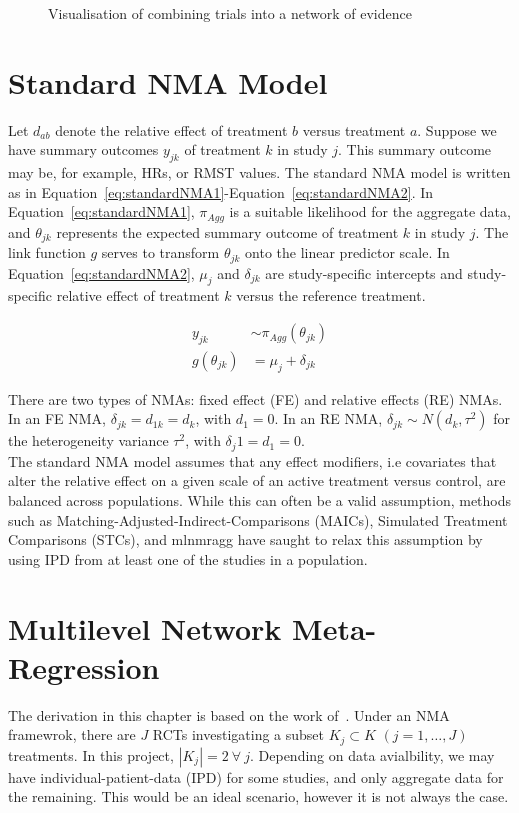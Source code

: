 \begin{figure}[h]
    \centering
    
    \caption{Visualisation of combining trials into a network of evidence}
    \label{fig:comb_evi}
\end{figure}

\section{Standard NMA Model}
Let $d_{ab}$ denote the relative effect of treatment $b$ versus treatment $a$. Suppose we have summary outcomes $y_{jk}$ of treatment $k$ in study $j$. This summary outcome may be, for example, HRs, or RMST values. The standard NMA model is written as in Equation~\ref{eq:standardNMA1}-Equation~\ref{eq:standardNMA2}. In Equation~\ref{eq:standardNMA1}, $\pi_{Agg}$ is a suitable likelihood for the aggregate data, and $\theta_{jk}$ represents the expected summary outcome of treatment $k$ in study $j$. The link function $g$ serves to transform $\theta_{jk}$ onto the linear predictor scale. In Equation~\ref{eq:standardNMA2}, $\mu_j$ and $\delta_{jk}$ are study-specific intercepts and study-specific relative effect of treatment $k$ versus the reference treatment.

\begin{align}
    y_{jk} &\sim \pi_{Agg}(\theta_{jk}) \label{eq:standardNMA1} \\
    g(\theta_{jk}) &= \mu_j + \delta_{jk} \label{eq:standardNMA2}
\end{align}

There are two types of NMAs: fixed effect (FE) and relative effects (RE) NMAs. In an FE NMA, $\delta_{jk} = d_{1k} = d_k$, with $d_1 = 0$. In an RE NMA, $\delta_{jk} \sim N(d_k, \tau^2)$ for the heterogeneity variance $\tau^2$, with $\delta_j1 = d_1 = 0$. \\

The standard NMA model assumes that any effect modifiers, i.e covariates that alter the relative effect on a given scale of an active treatment versus control, are balanced across populations. While this can often be a valid assumption, methods such as Matching-Adjusted-Indirect-Comparisons (MAICs), Simulated Treatment Comparisons (STCs), and mlnmragg have saught to relax this assumption by using IPD from at least one of the studies in a population.

\section{Multilevel Network Meta-Regression}
The derivation in this chapter is based on the work of~\cite{phillippo2024}. Under an NMA framewrok, there are $J$ RCTs investigating a subset $K_j \subset K$ $(j = 1,\ldots,J)$ treatments. In this project, $|K_j| = 2 \ \forall \ j$. Depending on data avialbility, we may have individual-patient-data (IPD) for some studies, and only aggregate data for the remaining. This would be an ideal scenario, however it is not always the case.

